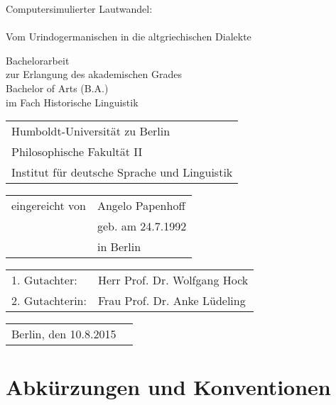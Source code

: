 \documentclass[12pt,a4paper,normalheadings,bibliography=totoc]{scrartcl}
\begin{document}
\begin{titlepage}
{
\begin{center}
\huge Computersimulierter Lautwandel:\\
\Large ~\\Vom Urindogermanischen in die altgriechischen Dialekte
\vfill

\noindent
\large
Bachelorarbeit\\
zur Erlangung des akademischen Grades\\
Bachelor of Arts (B.A.)\\
im Fach Historische Linguistik
\end{center}
\vfill

\normalsize
\noindent
\begin{tabular}{l}
Humboldt-Universität zu Berlin\\
Philosophische Fakultät II\\
Institut für deutsche Sprache und Linguistik
\end{tabular}
\vspace{3em}

\noindent
\begin{tabular}{l l}
eingereicht von & Angelo Papenhoff\\
& geb. am 24.7.1992\\
& in Berlin
\end{tabular}
\vspace{3em}

\noindent
\begin{tabular}{l l}
1. Gutachter: & Herr Prof. Dr. Wolfgang Hock\\
2. Gutachterin: & Frau Prof. Dr. Anke Lüdeling
\end{tabular}
\vspace{3em}

\noindent
\begin{tabular}{l l}
Berlin, den 10.8.2015
\end{tabular}
}
\end{titlepage}

\setcounter{page}{1}
\tableofcontents
\newpage

\onehalfspacing


\section{Abkürzungen und Konventionen}
\end{document}
